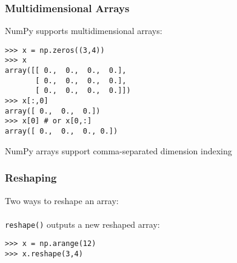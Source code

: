 \begin{frame}[fragile]\frametitle{Multidimensional Arrays}

    NumPy supports multidimensional arrays:
    \begin{lstlisting}
>>> x = np.zeros((3,4))
>>> x
array([[ 0.,  0.,  0.,  0.],
       [ 0.,  0.,  0.,  0.],
       [ 0.,  0.,  0.,  0.]])
>>> x[:,0]
array([ 0.,  0.,  0.])
>>> x[0] # or x[0,:]
array([ 0.,  0.,  0., 0.])
    \end{lstlisting}
    NumPy arrays support comma-separated dimension indexing

\end{frame}

%
%
%
%
%
%

\begin{frame}[fragile]\frametitle{Reshaping}
    Two ways to reshape an array:
    \\~\\
    \lstinline|reshape()| outputs a new reshaped array:
    \begin{lstlisting}
>>> x = np.arange(12)
>>> x.reshape(3,4)
    \end{lstlisting}
%    
\end{frame}

